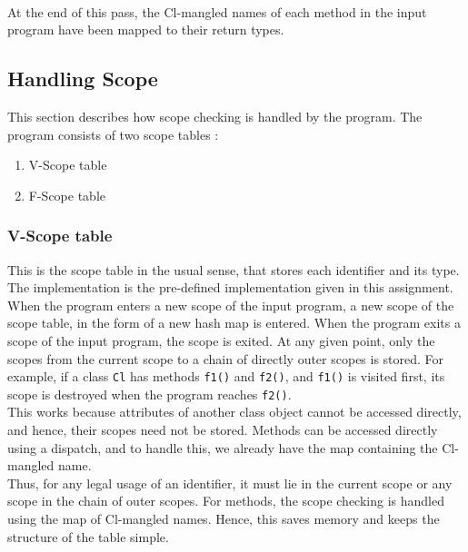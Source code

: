 \documentclass{article}
\begin{document}
~\\
At the end of this pass, the Cl-mangled names of each method in the input program have been mapped to their return types.

\subsection*{Handling Scope}
This section describes how scope checking is handled by the program. The program consists of two scope tables :
\begin{enumerate}
	\item V-Scope table
	\item F-Scope table
\end{enumerate}

\subsubsection*{V-Scope table}
This is the scope table in the usual sense, that stores each identifier and its type. The implementation is the pre-defined implementation given in this assignment. When the program enters a new scope of the input program, a new scope of the scope table, in the form of a new hash map is entered. When the program exits a scope of the input program, the scope is exited. At any given point, only the scopes from the current scope to a chain of directly outer scopes is stored. For example, if a class \verb|Cl| has methods \verb|f1()| and \verb|f2()|, and \verb|f1()| is visited first, its scope is destroyed when the program reaches \verb|f2()|.
\\
This works because attributes of another class object cannot be accessed directly, and hence, their scopes need not be stored. Methods can be accessed directly using a dispatch, and to handle this, we already have the map containing the Cl-mangled name.
\\
Thus, for any legal usage of an identifier, it must lie in the current scope or any scope in the chain of outer scopes. For methods, the scope checking is handled using the map of Cl-mangled names. Hence, this saves memory and keeps the structure of the table simple.
\end{document}
